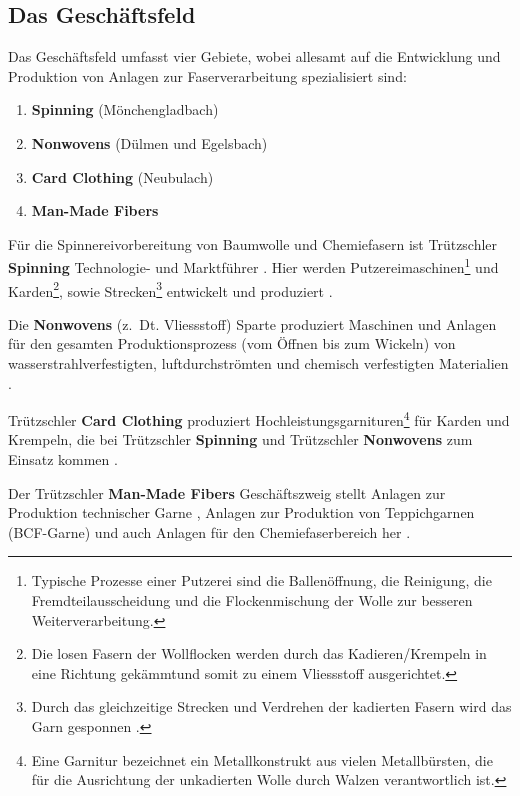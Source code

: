 \subsection{Das Geschäftsfeld}
    Das Geschäftsfeld umfasst vier Gebiete, wobei allesamt auf die Entwicklung und Produktion von Anlagen zur Faserverarbeitung spezialisiert sind: \cite{noauthor_familienunternehmen_nodate}

    \begin{enumerate}
        \item \textbf{Spinning} (Mönchengladbach)
        \item \textbf{Nonwovens} (Dülmen und Egelsbach)
        \item \textbf{Card Clothing} (Neubulach) 
        \item \textbf{Man-Made Fibers}
    \end{enumerate}

    Für die Spinnereivorbereitung von Baumwolle und Chemiefasern ist Trützschler \textbf{Spinning} Technologie- und Marktführer \cite{noauthor_trutzschler_nodate}.
    Hier werden Putzereimaschinen\footnote{Typische Prozesse einer Putzerei sind die Ballenöffnung, die Reinigung, die Fremdteilausscheidung und die Flockenmischung der Wolle zur besseren Weiterverarbeitung.} und Karden\footnote{Die losen Fasern der Wollflocken werden durch das Kadieren/Krempeln in eine Richtung \glqq gekämmt\grqq\@ und somit zu einem Vliessstoff ausgerichtet.}, sowie Strecken\footnote{Durch das gleichzeitige Strecken und Verdrehen der kadierten Fasern wird das Garn gesponnen \cite{tuchfabrik_von_2016}.} entwickelt und produziert \cite{noauthor_trutzschler_nodate-1}.

    Die \textbf{Nonwovens} (z.~Dt. Vliessstoff) Sparte produziert Maschinen und Anlagen für den gesamten Produktionsprozess (vom Öffnen bis zum Wickeln) von wasserstrahlverfestigten, luftdurchströmten und chemisch verfestigten Materialien \cite{noauthor_trutzschler_nodate-1}.

    Trützschler \textbf{Card Clothing} produziert Hochleistungsgarnituren\footnote{Eine Garnitur bezeichnet ein Metallkonstrukt aus vielen Metallbürsten, die für die Ausrichtung der unkadierten Wolle durch Walzen verantwortlich ist.} für Karden und Krempeln\footnotemark[2], die bei Trützschler \textbf{Spinning} und Trützschler \textbf{Nonwovens} zum Einsatz kommen \cite{noauthor_trutzschler_nodate-1}.


    Der Trützschler \textbf{Man-Made Fibers} Geschäftszweig stellt Anlagen zur Produktion technischer Garne \cite{noauthor_trutzschler_nodate}, Anlagen zur Produktion von Teppichgarnen (BCF-Garne) und auch Anlagen für den Chemiefaserbereich her \cite{noauthor_trutzschler_nodate-1}.